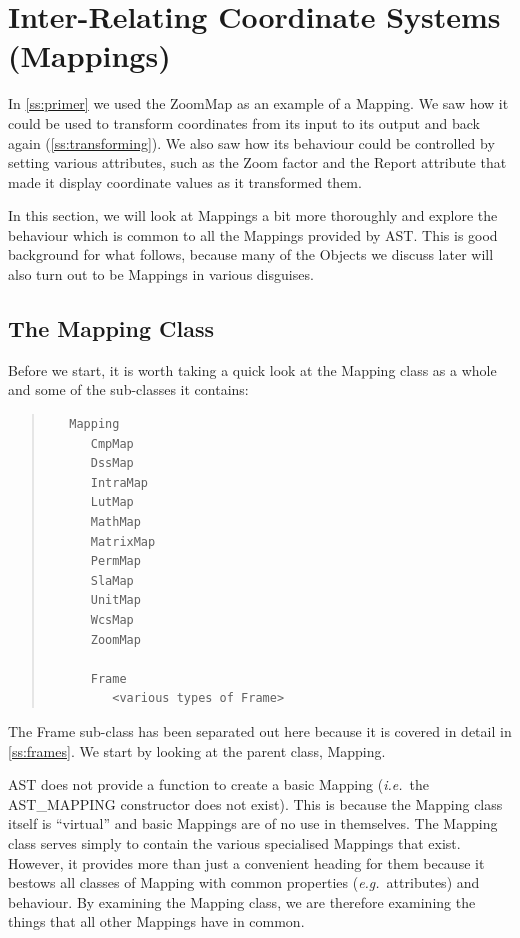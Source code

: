 \documentclass[twoside,11pt]{article}
\newcommand{\htmlref}[2]{#1}
\newcommand{\secref}[1]{\S\ref{#1}}
\renewcommand{\secref}[1]{\ref{#1}}
\begin{document}
\cleardoublepage
\section{\label{ss:mappings}Inter-Relating Coordinate Systems (Mappings)}

In \secref{ss:primer} we used the \htmlref{ZoomMap}{ZoomMap} as an example of a
\htmlref{Mapping}{Mapping}. We saw how it could be used to transform coordinates from its
input to its output and back again (\secref{ss:transforming}). We also
saw how its behaviour could be controlled by setting various
attributes, such as the \htmlref{Zoom}{Zoom} factor and the \htmlref{Report}{Report} attribute that made
it display coordinate values as it transformed them.

In this section, we will look at Mappings a bit more thoroughly and
explore the behaviour which is common to all the Mappings provided by
AST.  This is good background for what follows, because many of the
Objects we discuss later will also turn out to be Mappings in various
disguises.

\subsection{\label{ss:mappingclass}The Mapping Class}

Before we start, it is worth taking a quick look at the \htmlref{Mapping}{Mapping} class
as a whole and some of the sub-classes it contains:

\begin{quote}
\begin{verbatim}
   Mapping
      CmpMap
      DssMap
      IntraMap
      LutMap
      MathMap
      MatrixMap
      PermMap
      SlaMap
      UnitMap
      WcsMap
      ZoomMap

      Frame
         <various types of Frame>
\end{verbatim}
\end{quote}

The \htmlref{Frame}{Frame} sub-class has been separated out here because it is covered
in detail in \secref{ss:frames}. We start by looking at the parent
class, Mapping.

AST does not provide a function to create a basic Mapping
({\em{i.e.}}\ the AST\_MAPPING constructor does not exist). This is
because the Mapping class itself is ``virtual'' and basic Mappings are
of no use in themselves. The Mapping class serves simply to contain
the various specialised Mappings that exist.
However, it provides more than just a convenient heading for them
because it bestows all classes of Mapping with common properties
({\em{e.g.}}\ attributes) and behaviour.  By examining the Mapping
class, we are therefore examining the things that all other Mappings
have in common.
\end{document}
